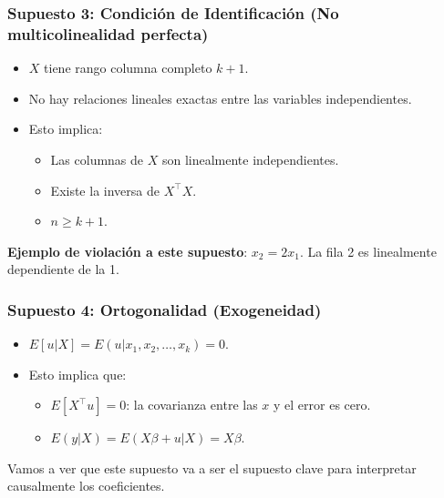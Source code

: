\documentclass{beamer}
\begin{document}
\begin{frame}
\frametitle{Supuesto 3: Condición de Identificación (No multicolinealidad perfecta)}
\begin{itemize}
    \item $X$ tiene rango columna completo $k + 1$.
    \item No hay relaciones lineales exactas entre las variables independientes.
    \item Esto implica:
    \begin{itemize}
        \item Las columnas de $X$ son linealmente independientes.
        \item Existe la inversa de $X^{\top}X$.
        \item $n \geq k + 1$.
    \end{itemize}
\end{itemize}
\textbf{Ejemplo de violación a este supuesto}: $x_2 = 2x_1$. La fila 2 es linealmente dependiente de la 1.
\end{frame}
\begin{frame}
\frametitle{Supuesto 4: Ortogonalidad (Exogeneidad)}
\begin{itemize}
    \item $E[u|X] = E(u|x_1, x_2, \ldots, x_k) = 0$.
    \item Esto implica que:
    \begin{itemize}
        \item $E[X^{\top}u] = 0$: la covarianza entre las $x$ y el error es cero.
        \item $E(y|X) = E(X\beta + u|X) = X\beta$.
    \end{itemize}
\end{itemize}
Vamos a ver que este supuesto va a ser el supuesto clave para interpretar causalmente los coeficientes.
\end{frame}
\end{document}
